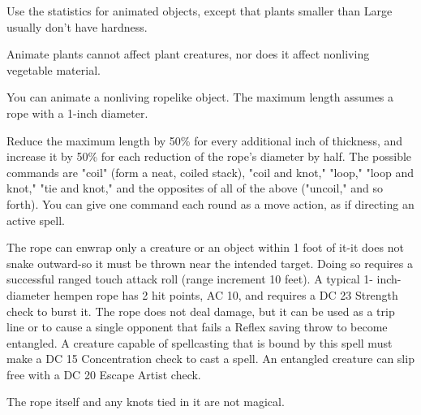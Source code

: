 \begin{multicols}{2}
\begin{small}
\smallskip\noindent Use the statistics for animated objects, except that plants smaller than Large usually don't have hardness.

\smallskip\noindent Animate plants cannot affect plant creatures, nor does it affect nonliving vegetable material.


\noindent You can animate a nonliving ropelike object. The maximum length assumes a rope with a 1-inch diameter.

\smallskip\noindent Reduce the maximum length by 50\% for every additional inch of thickness, and increase it by 50\% for each reduction of the rope's diameter by half.
The possible commands are "coil" (form a neat, coiled stack), "coil and knot," "loop," "loop and knot," "tie and knot," and the opposites of all of the above ("uncoil," and so forth). You can give one command each round as a move action, as if directing an active spell.

\smallskip\noindent The rope can enwrap only a creature or an object within 1 foot of it-it does not snake outward-so it must be thrown near the intended target. Doing so requires a successful ranged touch attack roll (range increment 10 feet). A typical 1- inch-diameter hempen rope has 2 hit points, AC 10, and requires a DC 23 Strength check to burst it. The rope does not deal damage, but it can be used as a trip line or to cause a single opponent that fails a Reflex saving throw to become entangled. A creature capable of spellcasting that is bound by this spell must make a DC 15 Concentration check to cast a spell. An entangled creature can slip free with a DC 20 Escape Artist check.

\smallskip\noindent The rope itself and any knots tied in it are not magical.


\end{small}
\end{multicols}
